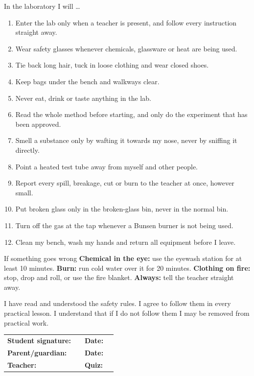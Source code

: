 \begin{infobox}{In the laboratory I will \dots}
\begin{enumerate}[leftmargin=1.6em, itemsep=3pt]
  \item Enter the lab only when a teacher is present, and follow every instruction straight away.
  \item Wear safety glasses whenever chemicals, glassware or heat are being used.
  \item Tie back long hair, tuck in loose clothing and wear closed shoes.
  \item Keep bags under the bench and walkways clear.
  \item Never eat, drink or taste anything in the lab.
  \item Read the whole method before starting, and only do the experiment that has been approved.
  \item Smell a substance only by wafting it towards my nose, never by sniffing it directly.
  \item Point a heated test tube away from myself and other people.
  \item Report every spill, breakage, cut or burn to the teacher at once, however small.
  \item Put broken glass only in the broken-glass bin, never in the normal bin.
  \item Turn off the gas at the tap whenever a Bunsen burner is not being used.
  \item Clean my bench, wash my hands and return all equipment before I leave.
\end{enumerate}
\end{infobox}

\begin{scaffold}{If something goes wrong}
\textbf{Chemical in the eye:} use the eyewash station for at least 10 minutes. \quad
\textbf{Burn:} run cold water over it for 20 minutes. \quad
\textbf{Clothing on fire:} stop, drop and roll, or use the fire blanket. \quad
\textbf{Always:} tell the teacher straight away.
\end{scaffold}

\vspace{6pt}
I have read and understood the safety rules. I agree to follow them in every practical lesson. I understand that if I do not follow them I may be removed from practical work.

\vspace{12pt}
\begin{tabular}{@{}p{4.2cm}p{7cm}p{1.6cm}p{2.8cm}@{}}
  \textbf{Student signature:} & \underline{\hspace{6.6cm}} & \textbf{Date:} & \underline{\hspace{2.6cm}} \\[16pt]
  \textbf{Parent/guardian:}  & \underline{\hspace{6.6cm}} & \textbf{Date:} & \underline{\hspace{2.6cm}} \\[16pt]
  \textbf{Teacher:}          & \underline{\hspace{6.6cm}} & \textbf{Quiz:} & \underline{\hspace{2.6cm}} \\
\end{tabular}
